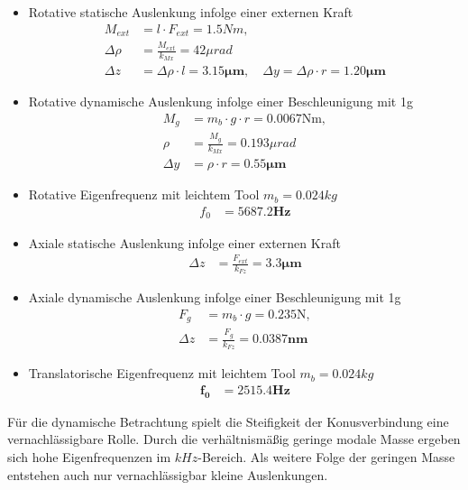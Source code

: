 \documentclass[10pt,a4paper]{iace.report}
\begin{document}
					\begin{itemize}
						\item Rotative statische Auslenkung infolge einer externen Kraft\\
							\begin{align*}
							M_{ext} &= l\cdot F_{ext} = 1.5Nm,\\ 
							\Delta\rho &= \frac{M_{ext}}{k_{Mx}} = 42\mu rad\\
							\Delta z &= \Delta\rho\cdot l=\bm{3.15\mu m},\quad \Delta y=\Delta\rho\cdot r=\bm{1.20\mu m}
							\end{align*}
						\item Rotative dynamische Auslenkung infolge einer Beschleunigung mit 1g\\
							\begin{align*}
							M_g &=m_b\cdot g \cdot r =0.0067\text{Nm},\\ 
							\rho &= \frac{M_{g}}{k_{Mx}} = 0.193\mu rad\\
							\Delta y&=\rho\cdot r=\bm{0.55 \mu m}
							\end{align*}
						\item Rotative Eigenfrequenz mit leichtem Tool $  m_b=0.024kg $ \\
							\begin{align*} 
							f_{0} &= \bm{5687.2 Hz} 
							\end{align*}
						\item Axiale statische Auslenkung infolge einer externen Kraft\\
							\begin{align*}
							\Delta z &= \frac{F_{ext}}{k_{Fz}} = \bm{3.3\mu m}
							\end{align*}
						\item Axiale dynamische Auslenkung infolge einer Beschleunigung mit 1g\\
							\begin{align*}
							F_g &=m_b\cdot g = 0.235\text{N},\\
							\Delta z&=\frac{F_g}{k_{Fz}}= \bm{0.0387nm}
							\end{align*}
						\item Translatorische Eigenfrequenz mit leichtem Tool $  m_b=0.024kg $ \\
							\begin{align*}
							\bm{f_{0}} &= \bm{2515.4 Hz} 
							\end{align*}
					\end{itemize}
					Für die dynamische Betrachtung spielt die Steifigkeit der Konusverbindung eine vernachlässigbare Rolle. Durch die verhältnismäßig geringe modale Masse ergeben sich hohe Eigenfrequenzen im $ kHz $-Bereich. Als weitere Folge der geringen Masse entstehen auch nur vernachlässigbar kleine Auslenkungen.
					
\end{document}
